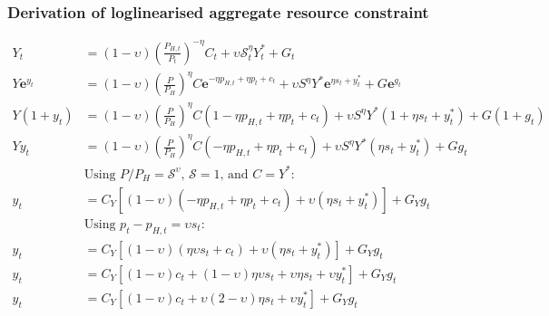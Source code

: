 \subsubsection{Derivation of loglinearised aggregate resource constraint}
\begin{align}\label{eq:appendix_log_rc_beginning}
    Y_t &= (1-\upsilon)\left(\frac{P_{H,t}}{P_t}\right)^{-\eta}C_t + \upsilon \mathcal{S}_t^{\eta}Y_t^* + G_t\\
    Y \mathbf{e}^{y_t} &= (1-\upsilon)\left(\frac{P}{P_{H}}\right)^{\eta}C \mathbf{e}^{-\eta p_{H,t} + \eta p_t + c_t}+ \upsilon S^{\eta} Y^* \mathbf{e}^{\eta s_t + y^*_t} + G \mathbf{e}^{g_t}\\
    Y ({1+y_t}) &= (1-\upsilon)\left(\frac{P}{P_{H}}\right)^{\eta}C ({1 -\eta p_{H,t} + \eta p_t + c_t})+ \upsilon S^{\eta} Y^* ({1 + \eta s_t + y^*_t}) + G ({1+ g_t})\\
    Y y_t &= (1-\upsilon)\left(\frac{P}{P_{H}}\right)^{\eta}C ({-\eta p_{H,t} + \eta p_t + c_t})+ \upsilon S^{\eta} Y^* ({\eta s_t + y^*_t}) + G g_t\\
    &\text{Using $P/P_H = \mathcal{S}^\upsilon$, $\mathcal{S} = 1$, and $C=Y^*$}:\nonumber\\
    y_t &= C_Y\left[(1-\upsilon)({-\eta p_{H,t} + \eta p_t + c_t})+ \upsilon ({\eta s_t + y^*_t})\right] + G_Y g_t\\
    &\text{Using $p_t - p_{H,t} = \upsilon s_t$}:\nonumber\\
    y_t &= C_Y\left[(1-\upsilon)({\eta \upsilon s_t + c_t})+ \upsilon ({\eta s_t + y^*_t})\right] + G_Y g_t\\
    y_t &= C_Y\left[(1-\upsilon)c_t + (1-\upsilon) \eta \upsilon s_t + \upsilon {\eta s_t} + \upsilon y^*_t\right] + G_Y g_t\\
    y_t &= C_Y\left[(1-\upsilon)c_t + \upsilon (2-\upsilon)\eta s_t + \upsilon y^*_t\right] + G_Y g_t \label{eq:appendix_log_rc_end}
\end{align}
\newpage